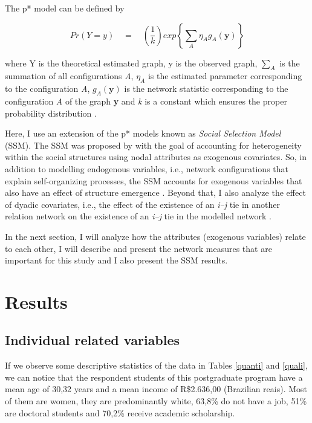 \documentclass[a4paper, 12pt, openright, oneside, article, german, french, brazil, english]{abntex2}
\begin{document}
The p* model can be defined by

\begin{equation}
Pr(Y=y) \quad = \quad \left(\frac{1}{k}\right) exp \left\{ \sum_{A} \eta_A g_A (\textbf{y}) \right\}
\end{equation}

where Y is the theoretical estimated graph, y is the observed graph, $\sum_{A}$ is the summation of all configurations \textit{A},  $\eta_A$ is the estimated parameter corresponding to the configuration \textit{A}, $g_A(\textbf{y})$ is the network statistic corresponding to the configuration \textit{A} of the graph \textbf{y} and \textit{k} is a constant which ensures the proper probability distribution \cite{robins2007introduction}.

Here, I use an extension of the p* models known as \textit{Social Selection Model} (SSM). The SSM was proposed by  with the goal of accounting for heterogeneity within the social structures using nodal attributes as exogenous covariates. So, in addition to modelling endogenous variables, i.e., network configurations that explain self-organizing processes, the SSM accounts for exogenous variables that also have an effect of structure emergence \cite{wang2016social}. Beyond that, I also analyze the effect of dyadic covariates, i.e., the effect of the existence of an \textit{i--j} tie in another relation network on the existence of an \textit{i--j} tie in the modelled network \cite{robins2013social}.

In the next section, I will analyze how the attributes (exogenous variables) relate to each other, I will describe and present the network measures that are important for this study and I also present the SSM results.

\section{Results}
\subsection{Individual related variables}

If we observe some descriptive statistics of the data in Tables \ref{quanti} and \ref{quali}, we can notice that the respondent students of this postgraduate program have a mean age of 30,32 years and a mean income of R\$2.636,00 (Brazilian reais). Most of them are women, they are predominantly white, 63,8\% do not have a job, 51\% are doctoral students and 70,2\% receive academic scholarship.
\end{document}

